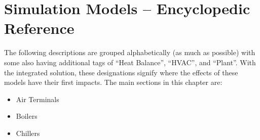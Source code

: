 \chapter{Simulation Models -- Encyclopedic Reference}\label{simulation-models---encyclopedic-reference}

The following descriptions are grouped alphabetically (as much as possible) with some also having additional tags of ``Heat Balance'', ``HVAC'', and ``Plant''. With the integrated solution, these designations signify where the effects of these models have their first impacts. The main sections in this chapter are:

\begin{itemize}
  \item Air Terminals
  \item Boilers
  \item Chillers 
\end{itemize}
